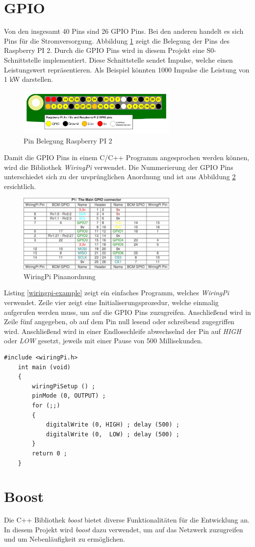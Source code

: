 \section{GPIO}
\label{gpio}
Von den insgesamt 40 Pins sind 26 GPIO Pins. Bei den anderen handelt es sich Pins für die Stromversorgung. Abbildung \ref{gpio-pins} zeigt die Belegung der Pins des Raspberry PI 2. Durch die GPIO Pins wird in diesem Projekt eine S0-Schnittstelle implementiert. Diese Schnittstelle sendet Impulse, welche einen Leistungswert repräsentieren. Als Beispiel könnten 1000 Impulse die Leistung von 1 kW darstellen.
\begin{figure}[H]
	\centering
	\includegraphics[width=0.7\textwidth]{bilder/gpio-pins.png}
	\caption{Pin Belegung Raspberry PI 2}
	\label{gpio-pins}
\end{figure}
\noindent
Damit die GPIO Pins in einem C/C++ Programm angesprochen werden können, wird die Bibliothek \textit{WiringPi} verwendet. %
Die Nummerierung der GPIO Pins unterschiedet sich zu der ursprünglichen Anordnung und ist aus Abbildung \ref{wiringpi} ersichtlich.
 \begin{figure}[H]
 	\centering
 	\includegraphics[width=0.7\textwidth]{bilder/wiringpi.png}
 	\caption{WiringPi Pinanordnung}
 	\label{wiringpi}
 \end{figure}
\noindent
Listing \ref{wiringpi-example} zeigt ein einfaches Programm, welches \textit{WiringPi} verwendet. Zeile vier zeigt eine Initialiserungsprozedur, welche einmalig aufgerufen werden muss, um auf die GPIO Pins zuzugreifen. Anschließend wird in Zeile fünf angegeben, ob auf dem Pin null lesend oder schreibend zugegriffen wird. Anschließend wird in einer Endlosschleife abwechselnd der Pin auf \textit{HIGH} oder \textit{LOW} gesetzt, jeweils mit einer Pause von 500 Millisekunden.
\begin{lstlisting}[frame=single, basicstyle=\tiny, caption=WiringPi Beispiel, label=wiringpi-example]
	#include <wiringPi.h>
	int main (void)
	{
		wiringPiSetup () ;
		pinMode (0, OUTPUT) ;
		for (;;)
		{
			digitalWrite (0, HIGH) ; delay (500) ;
			digitalWrite (0,  LOW) ; delay (500) ;
		}
		return 0 ;
	}
\end{lstlisting}
\section{Boost}
Die C++ Bibliothek \textit{boost} bietet diverse Funktionalitäten für die Entwicklung an. In diesem Projekt wird \textit{boost} dazu verwendet, um auf das Netzwerk zuzugreifen und um Nebenläufigkeit zu ermöglichen. 
